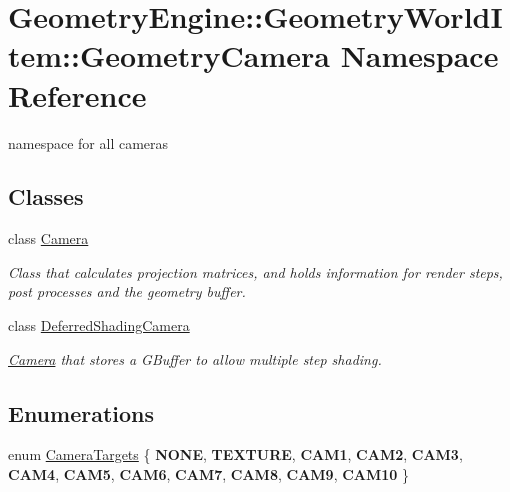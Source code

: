 \hypertarget{namespace_geometry_engine_1_1_geometry_world_item_1_1_geometry_camera}{}\section{Geometry\+Engine\+::Geometry\+World\+Item\+::Geometry\+Camera Namespace Reference}
\label{namespace_geometry_engine_1_1_geometry_world_item_1_1_geometry_camera}


namespace for all cameras  


\subsection*{Classes}
\begin{DoxyCompactItemize}
\item 
class \mbox{\hyperlink{class_geometry_engine_1_1_geometry_world_item_1_1_geometry_camera_1_1_camera}{Camera}}
\begin{DoxyCompactList}\small\item\em Class that calculates projection matrices, and holds information for render steps, post processes and the geometry buffer. \end{DoxyCompactList}\item 
class \mbox{\hyperlink{class_geometry_engine_1_1_geometry_world_item_1_1_geometry_camera_1_1_deferred_shading_camera}{Deferred\+Shading\+Camera}}
\begin{DoxyCompactList}\small\item\em \mbox{\hyperlink{class_geometry_engine_1_1_geometry_world_item_1_1_geometry_camera_1_1_camera}{Camera}} that stores a G\+Buffer to allow multiple step shading. \end{DoxyCompactList}\end{DoxyCompactItemize}
\subsection*{Enumerations}
\begin{DoxyCompactItemize}
\item 
enum \mbox{\hyperlink{namespace_geometry_engine_1_1_geometry_world_item_1_1_geometry_camera_a3766848bae97ff8203fa26907ac359ef}{Camera\+Targets}} \{ \newline
{\bfseries N\+O\+NE}, 
{\bfseries T\+E\+X\+T\+U\+RE}, 
{\bfseries C\+A\+M1}, 
{\bfseries C\+A\+M2}, 
\newline
{\bfseries C\+A\+M3}, 
{\bfseries C\+A\+M4}, 
{\bfseries C\+A\+M5}, 
{\bfseries C\+A\+M6}, 
\newline
{\bfseries C\+A\+M7}, 
{\bfseries C\+A\+M8}, 
{\bfseries C\+A\+M9}, 
{\bfseries C\+A\+M10}
 \}
\end{DoxyCompactItemize}


